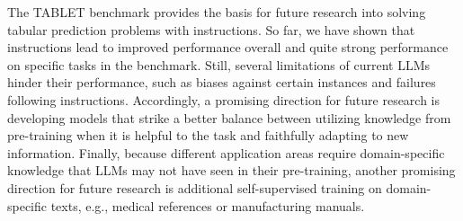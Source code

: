 The TABLET benchmark provides the basis for future research into solving tabular prediction problems with instructions. So far, we have shown that instructions lead to improved performance overall and quite strong performance on specific tasks in the benchmark. Still, several limitations of current LLMs hinder their performance, such as biases against certain instances and failures following instructions. Accordingly, a promising direction for future research is developing models that strike a better balance between utilizing knowledge from pre-training when it is helpful to the task and faithfully adapting to new information. Finally, because different application areas require domain-specific knowledge that LLMs may not have seen in their pre-training, another promising direction for future research is additional self-supervised training on domain-specific texts, e.g., medical references or manufacturing manuals.


